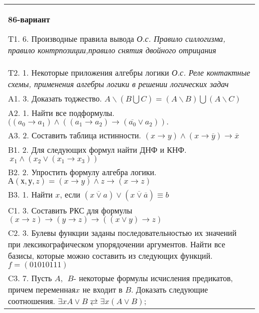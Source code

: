 \documentclass{article}
\begin{document}
\begin{tabular}{m{17cm}}
\textbf{86-вариант}
\newline

T1. 6. Производные правила вывода \emph{О.с. Правило силлогизма, правило контрпозиции,правило снятия двойного отрицания} \\
T2. 1. Некоторые приложения алгебры логики \emph{О.с. Реле контактные схемы, применения алгебры логики в решении логических задач} \\
A1. 3. Доказать тоджество. \(A\backslash(B\bigcup C) = (A\backslash B)\bigcup(A\backslash C)\) \\
A2. 1. Найти все подформулы. \(((a_{0} \rightarrow a_{1}) \land ((a_{1} \rightarrow a_{2}) \rightarrow (\overline{a_{0}} \vee a_{2})).\) \\
A3. 2. Составить таблица истинности. \((x \rightarrow y) \land (x \rightarrow \overline{y}) \rightarrow \overline{x}\) \\
B1. 2. Для следующих формул найти ДНФ и КНФ. \(\ x_{1} \land (x_{2} \vee (x_{1} \rightarrow x_{3}))\) \\
B2. 2. Упростить формулу алгебра логики. \(А(х,у,z) = (x \rightarrow y) \land z \rightarrow (x \rightarrow z)\) \\
B3. 1. Найти \(x\), если \(\left( \overline{x \vee a} \right) \vee \left( \overline{x \vee \overline{a}} \right) \equiv b\) \\
C1. 3. Составить РКС для формулы \((x \rightarrow z) \rightarrow (y \rightarrow z) \rightarrow ((x \vee y) \rightarrow z)\) \\
C2. 3. Булевы функции заданы последовательностью их значений при лексикографическом упорядочении аргументов. Найти все базисы, которые можно составить из следующих функций. \(f = (01010111)\) \\
C3. 7. Пусть \(A,\ \ B\)- некоторые формулы исчисления предикатов, причем переменная\(x\) не входит в \(B\). Доказать следующие соотношения. \(\exists xA \vee B \rightleftarrows \exists x(A \vee B)\); \\

\end{tabular}
\vspace{1cm}
\end{document}
